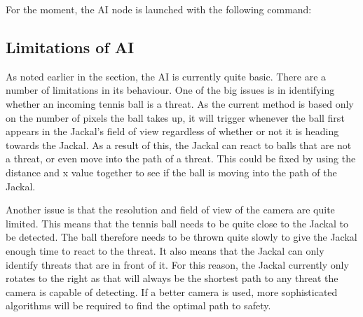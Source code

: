 \documentclass[../main.tex]{subfiles}
\begin{document}
For the moment, the AI node is launched with the following command:

\subsection{Limitations of AI}
As noted earlier in the section, the AI is currently quite basic. There are a number of limitations in its behaviour. One of the big issues is in identifying whether an incoming tennis ball is a threat. As the current method is based only on the number of pixels the ball takes up, it will trigger whenever the ball first appears in the Jackal's field of view regardless of whether or not it is heading towards the Jackal. As a result of this, the Jackal can react to balls that are not a threat, or even move into the path of a threat. This could be fixed by using the distance and x value together to see if the ball is moving into the path of the Jackal. 

Another issue is that the resolution and field of view of the camera are quite limited. This means that the tennis ball needs to be quite close to the Jackal to be detected. The ball therefore needs to be thrown quite slowly to give the Jackal enough time to react to the threat. It also means that the Jackal can only identify threats that are in front of it. For this reason, the Jackal currently only rotates to the right as that will always be the shortest path to any threat the camera is capable of detecting. If a better camera is used, more sophisticated algorithms will be required to find the optimal path to safety.
\end{document}
